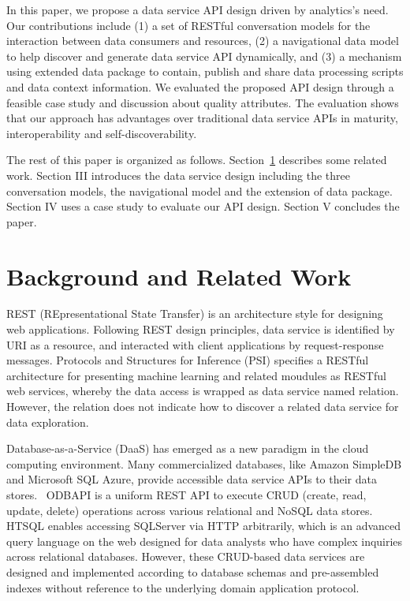 \documentclass[10pt, conference, compsocconf]{IEEEtran}
\begin{document}
In this paper, we propose a data service API design driven by analytics's need. Our contributions include (1) a set of RESTful conversation models for the interaction between data consumers and resources, (2) a navigational data model to help discover and  generate data service API dynamically, and (3) a mechanism using extended data package to contain, publish and share data processing scripts and data context information. We evaluated the proposed API design through a feasible case study and discussion about quality attributes. The evaluation shows that our approach has advantages over traditional data service APIs in maturity, interoperability and self-discoverability. 

The rest of this paper is organized as follows. Section~\ref{background} describes some related work. Section III introduces the data service design including the three conversation models, the navigational model and the extension of data package. Section IV uses a case study to evaluate our API design. Section V concludes the paper.

\section{Background and Related Work}
\label{background}
REST (REpresentational State Transfer) \cite{fielding2000architectural} is an architecture style for designing web applications. Following REST design principles, data service is identified by URI as a resource, and interacted with client applications by request-response messages. Protocols and Structures for Inference (PSI)\cite{PSI} specifies a RESTful architecture for presenting machine learning and related moudules as RESTful web services, whereby the data access is wrapped as data service named relation. However, the relation does not indicate how to discover a related data service for data exploration.

Database-as-a-Service (DaaS) has emerged as a new paradigm in the cloud computing environment. Many commercialized databases, like Amazon SimpleDB\cite{Amazon} and Microsoft SQL Azure\cite{Azure}, provide accessible data service APIs to their data stores.  ODBAPI\cite{sellami2014odbapi} is a uniform REST API to execute CRUD (create, read, update, delete) operations across various relational and NoSQL data stores. HTSQL\cite{HTSQL} enables accessing SQLServer via HTTP arbitrarily, which is an advanced query language on the web designed for data analysts who have complex inquiries across relational databases. However, these CRUD-based data services are designed and implemented according to database schemas and pre-assembled indexes without reference to the underlying domain application protocol.
\end{document}
